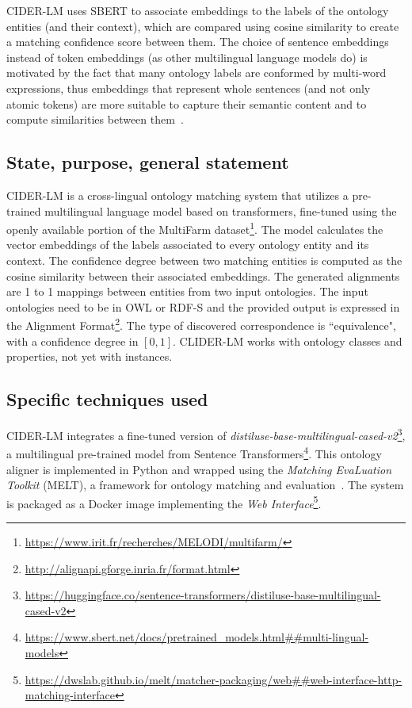 \documentclass[
]{ceurart}
\begin{document}
CIDER-LM uses SBERT to associate embeddings to the labels of the ontology entities (and their context), which are compared using cosine similarity to create a matching confidence score between them. The choice of sentence embeddings instead of token embeddings (as other multilingual language models do) is motivated by the fact that many ontology labels are conformed by multi-word expressions, thus embeddings that represent whole sentences (and not only atomic tokens) are more suitable to capture their semantic content and to compute similarities between them~\cite{Neutela2021, Reimers2019}.

\subsection{State, purpose, general statement}

CIDER-LM is a cross-lingual ontology matching system that utilizes a pre-trained multilingual language model based on transformers, fine-tuned using the openly available portion of the MultiFarm dataset\footnote{\url{https://www.irit.fr/recherches/MELODI/multifarm/}}. The model calculates the vector embeddings of the labels associated to
every ontology entity and its context. The confidence degree between two matching entities is computed as
the cosine similarity between their associated embeddings.
The generated alignments are 1 to 1 mappings between entities from two input ontologies. The input ontologies need to be in OWL or RDF-S and the provided output is expressed in the Alignment Format\footnote{\url{http://alignapi.gforge.inria.fr/format.html}}. The type of discovered correspondence is ``equivalence", with a confidence degree in $[0,1]$. CLIDER-LM works with ontology classes and properties, not yet with instances.

\subsection{Specific techniques used}


CIDER-LM integrates a fine-tuned version of \textit{distiluse-base-multilingual-cased-v2}\footnote{\url{https://huggingface.co/sentence-transformers/distiluse-base-multilingual-cased-v2}}, a multilingual pre-trained model from Sentence Transformers\footnote{\url{https://www.sbert.net/docs/pretrained_models.html##multi-lingual-models}}.
This ontology aligner is implemented in Python and wrapped using the \textit{Matching EvaLuation Toolkit} (MELT), a framework for ontology matching and evaluation~\cite{Hertling2019melt}. The system is packaged as a Docker image implementing the \textit{Web Interface}\footnote{\url{https://dwslab.github.io/melt/matcher-packaging/web##web-interface-http-matching-interface}}. 
\end{document}
